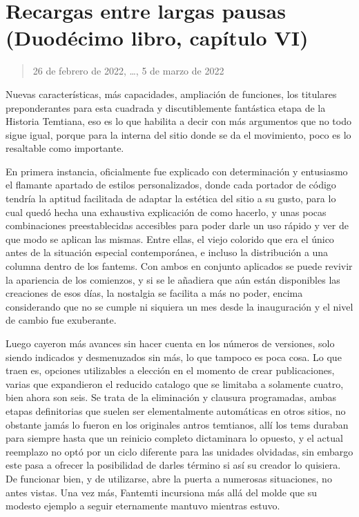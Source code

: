 \documentclass[
]{book}
\begin{document}
\hypertarget{recargas-entre-largas-pausas-duoduxe9cimo-libro-capuxedtulo-vi}{%
\section{Recargas entre largas pausas (Duodécimo libro, capítulo VI)}\label{recargas-entre-largas-pausas-duoduxe9cimo-libro-capuxedtulo-vi}}

\begin{quote}
26 de febrero de 2022, \ldots, 5 de marzo de 2022
\end{quote}

Nuevas características, más capacidades, ampliación de funciones, los titulares preponderantes para esta cuadrada y discutiblemente fantástica etapa de la Historia Temtiana, eso es lo que habilita a decir con más argumentos que no todo sigue igual, porque para la interna del sitio donde se da el movimiento, poco es lo resaltable como importante.

En primera instancia, oficialmente fue explicado con determinación y entusiasmo el flamante apartado de estilos personalizados, donde cada portador de código tendría la aptitud facilitada de adaptar la estética del sitio a su gusto, para lo cual quedó hecha una exhaustiva explicación de como hacerlo, y unas pocas combinaciones preestablecidas accesibles para poder darle un uso rápido y ver de que modo se aplican las mismas. Entre ellas, el viejo colorido que era el único antes de la situación especial contemporánea, e incluso la distribución a una columna dentro de los fantems. Con ambos en conjunto aplicados se puede revivir la apariencia de los comienzos, y si se le añadiera que aún están disponibles las creaciones de esos días, la nostalgia se facilita a más no poder, encima considerando que no se cumple ni siquiera un mes desde la inauguración y el nivel de cambio fue exuberante.

Luego cayeron más avances sin hacer cuenta en los números de versiones, solo siendo indicados y desmenuzados sin más, lo que tampoco es poca cosa. Lo que traen es, opciones utilizables a elección en el momento de crear publicaciones, varias que expandieron el reducido catalogo que se limitaba a solamente cuatro, bien ahora son seis. Se trata de la eliminación y clausura programadas, ambas etapas definitorias que suelen ser elementalmente automáticas en otros sitios, no obstante jamás lo fueron en los originales antros temtianos, allí los tems duraban para siempre hasta que un reinicio completo dictaminara lo opuesto, y el actual reemplazo no optó por un ciclo diferente para las unidades olvidadas, sin embargo este pasa a ofrecer la posibilidad de darles término si así su creador lo quisiera. De funcionar bien, y de utilizarse, abre la puerta a numerosas situaciones, no antes vistas. Una vez más, Fantemti incursiona más allá del molde que su modesto ejemplo a seguir eternamente mantuvo mientras estuvo.
\end{document}
